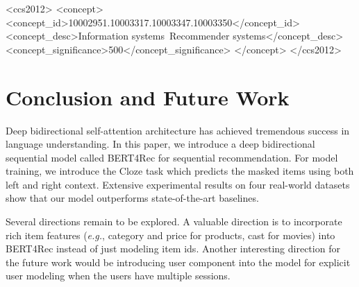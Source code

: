 \documentclass[sigconf]{acmart}
\begin{document}
\begin{CCSXML}
<ccs2012>
<concept>
<concept_id>10002951.10003317.10003347.10003350</concept_id>
<concept_desc>Information systems~Recommender systems</concept_desc>
<concept_significance>500</concept_significance>
</concept>
</ccs2012>
\end{CCSXML}





\maketitle






\section{Conclusion and Future Work}

Deep bidirectional self-attention architecture has achieved tremendous success in language understanding.
In this paper, we introduce a deep bidirectional sequential model called BERT4Rec for sequential recommendation.
For model training, we introduce the Cloze task which predicts the masked items using both left and right context.
Extensive experimental results on four real-world datasets show that our model outperforms state-of-the-art baselines.

Several directions remain to be explored.
A valuable direction is to incorporate rich item features (\textit{e.g.}, category and price for products, cast for movies) into BERT4Rec instead of just modeling item ids. %
Another interesting direction for the future work would be introducing user component into the model for explicit user modeling when the users have multiple sessions.






\end{document}
